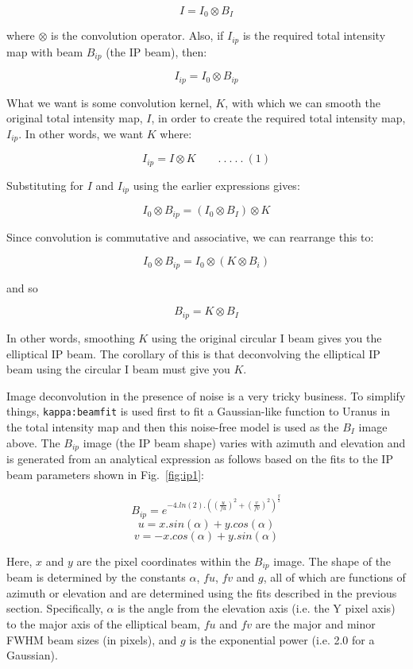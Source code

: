 \documentclass[twoside,11pt]{starlink}
\begin{document}
\begin{itemize}
\[ I = I_{0} \otimes B_{I} \]

where $\otimes$ is the convolution operator. Also, if $I_{ip}$ is the required
total intensity map with beam $B_{ip}$ (the IP beam), then:

\[ I_{ip} = I_{0} \otimes B_{ip} \]

What we want is some convolution kernel, $K$, with which we can smooth the
original total intensity map, $I$, in order to create the required total
intensity map, $I_{ip}$. In other words, we want $K$ where:

\[ I_{ip} = I \otimes K\qquad .\ .\ .\ .\ .\ (1)\]

Substituting for $I$ and $I_{ip}$ using the earlier expressions gives:

\[ I_{0} \otimes B_{ip} = ( I_{0} \otimes B_{I} ) \otimes K \]

Since convolution is commutative and associative, we can rearrange this to:

\[ I_{0} \otimes B_{ip} = I_{0} \otimes ( K \otimes B_{i} ) \]

and so

\[ B_{ip} = K \otimes B_{I} \]

In other words, smoothing $K$ using the original circular I beam gives you
the elliptical IP beam. The corollary of this is that deconvolving the
elliptical IP beam using the circular I beam must give you $K$.

Image deconvolution in the presence of noise is a very tricky business.
To simplify things, \texttt{kappa:beamfit} is used first to fit a Gaussian-like
function to Uranus in the total intensity map and then this noise-free
model is used as the $B_{I}$ image above. The $B_{ip}$ image (the IP beam
shape) varies with azimuth and elevation and is generated from an analytical
expression as follows based on the fits to the IP beam parameters shown in
Fig.~\ref{fig:ip1}:

\[ B_{ip} = e^{ -4.ln(2).\left( \left( \frac{u}{fu} \right)^{2} +
\left( \frac{v}{fv} \right)^{2}\right)^{\frac{g}{2}}} \]
\[ u = x.sin(\alpha) + y.cos(\alpha) \]
\[ v = -x.cos(\alpha) + y.sin(\alpha) \]

Here, $x$ and $y$ are the pixel coordinates within the $B_{ip}$ image. The
shape of the beam is determined by the constants $\alpha$, $fu$, $fv$ and
$g$, all of which are functions of azimuth or elevation and are determined
using the fits described in the previous section. Specifically, $\alpha$
is the angle from the elevation axis (i.e. the Y pixel axis) to the major axis of the
elliptical beam, $fu$ and $fv$ are the major and minor FWHM beam sizes
(in pixels), and $g$ is the exponential power (i.e. 2.0 for a Gaussian).


\end{itemize}
\end{document}
